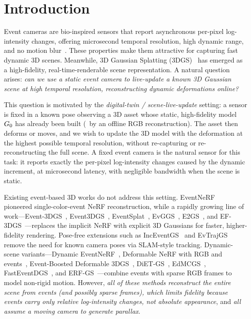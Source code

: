 \section{Introduction}
\label{sec:intro}

Event cameras are bio-inspired sensors that report asynchronous per-pixel log-intensity changes, offering microsecond temporal resolution, high dynamic range, and no motion blur~\cite{gallego2020event}. These properties make them attractive for capturing fast dynamic 3D scenes. Meanwhile, 3D Gaussian Splatting (3DGS)~\cite{kerbl3Dgaussians} has emerged as a high-fidelity, real-time-renderable scene representation. A natural question arises: \emph{can we use a static event camera to live-update a known 3D Gaussian scene at high temporal resolution, reconstructing dynamic deformations online?}

This question is motivated by the \emph{digital-twin / scene-live-update} setting: a sensor is fixed in a known pose observing a 3D asset whose static, high-fidelity model $G_0$ has already been built (\eg\ by an offline RGB reconstruction). The asset then deforms or moves, and we wish to update the 3D model with the deformation at the highest possible temporal resolution, without re-capturing or re-reconstructing the full scene. A fixed event camera is the natural sensor for this task: it reports exactly the per-pixel log-intensity changes caused by the dynamic increment, at microsecond latency, with negligible bandwidth when the scene is static.

Existing event-based 3D works do not address this setting. EventNeRF~\cite{eventnerf} pioneered single-color-event NeRF reconstruction, while a rapidly growing line of work---Event-3DGS~\cite{event3dgs}, Event3DGS~\cite{xiong2025event3dgs}, EventSplat~\cite{eventsplat}, EvGGS~\cite{evggs}, E2GS~\cite{e2gs}, and EF-3DGS~\cite{ef3dgs}---replaces the implicit NeRF with explicit 3D Gaussians for faster, higher-fidelity rendering. Pose-free extensions such as IncEventGS~\cite{inceventgs} and EvTrajGS~\cite{evtrajgs} remove the need for known camera poses via SLAM-style tracking. Dynamic-scene variants---Dynamic EventNeRF~\cite{dynamiceventnerf}, Deformable NeRF with RGB and events~\cite{defnerfevent}, Event-Boosted Deformable 3DGS~\cite{eventboostdeform3dgs}, DiET-GS~\cite{dietgs}, EdMCGS~\cite{edmcgs}, FastEventDGS~\cite{fasteventdgs}, and ERF-GS~\cite{erfgs}---combine events with sparse RGB frames to model non-rigid motion. However, \emph{all of these methods reconstruct the entire scene from events (and possibly sparse frames), which limits fidelity because events carry only relative log-intensity changes, not absolute appearance}, and \emph{all assume a moving camera to generate parallax}.

